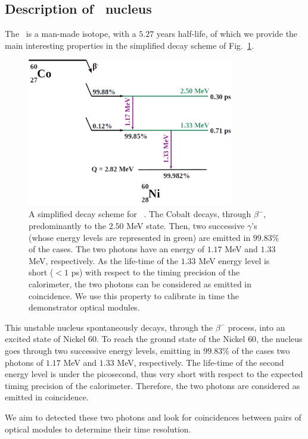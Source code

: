 \subsection{Description of \Co\ nucleus}
\label{subsec:CoSource}
The \Co\ is a man-made isotope, with a $5.27$ years half-life, of which we provide the main interesting properties in the simplified decay scheme of Fig.~\ref{fig:Co_decay_scheme}.
\begin{figure}[h]
  \centering
  \includegraphics[width=9cm]{commissioning/fig_commissioning/Co_decay_scheme.pdf}
  \caption{A simplified decay scheme for \Co~\cite{web:nucleide}.
    The Cobalt decays, through $\beta^{-}$, predominantly to the $2.50$ MeV state.
    Then, two successive $\gamma$'s (whose energy levels are represented in green) are emitted in $99.83$\% of the cases.
    The two photons have an energy of $1.17$ MeV and $1.33$ MeV, respectively.
    As the life-time of the $1.33$ MeV energy level is short ($<1$ ps) with respect to the timing precision of the calorimeter, the two photons can be considered as emitted in coincidence.
    We use this property to calibrate in time the demonstrator optical modules.
    \label{fig:Co_decay_scheme}}
\end{figure}
This unstable nucleus spontaneously decays, through the $\beta^{-}$ process, into an excited state of Nickel $60$.
To reach the ground state of the Nickel $60$, the nucleus goes through two successive energy levels, emitting in $99.83$\% of the cases two photons of $1.17$ MeV and $1.33$ MeV, respectively.
The life-time of the second energy level is under the picosecond, thus very short with respect to the expected timing precision of the calorimeter.
Therefore, the two photons are considered as emitted in coincidence.

We aim to detected these two photons and look for coincidences between pairs of optical modules to determine their time resolution.


